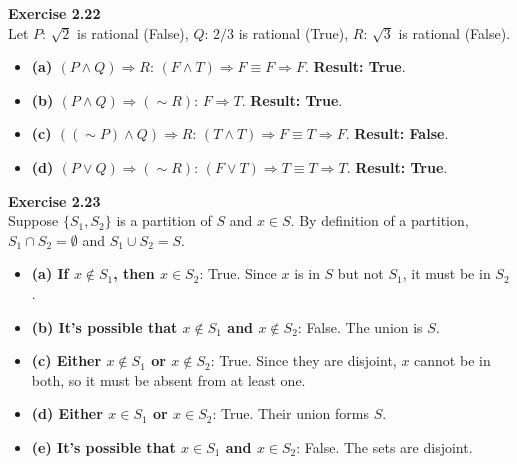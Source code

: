 \documentclass[11pt]{article}
\begin{document}
\vspace{10pt}
\textbf{Exercise 2.22} \\
Let $P$: $\sqrt{2}$ is rational (False), $Q$: $2/3$ is rational (True), $R$: $\sqrt{3}$ is rational (False).
\begin{itemize}
    \item \textbf{(a) $(P \wedge Q) \Rightarrow R$}: $(F \wedge T) \Rightarrow F \equiv F \Rightarrow F$. \textbf{Result: True}.
    \item \textbf{(b) $(P \wedge Q) \Rightarrow (\sim R)$}: $F \Rightarrow T$. \textbf{Result: True}.
    \item \textbf{(c) $((\sim P) \wedge Q) \Rightarrow R$}: $(T \wedge T) \Rightarrow F \equiv T \Rightarrow F$. \textbf{Result: False}.
    \item \textbf{(d) $(P \vee Q) \Rightarrow (\sim R)$}: $(F \vee T) \Rightarrow T \equiv T \Rightarrow T$. \textbf{Result: True}.
\end{itemize}

\vspace{10pt}
\textbf{Exercise 2.23} \\
Suppose $\{S_1, S_2\}$ is a partition of $S$ and $x \in S$. By definition of a partition, $S_1 \cap S_2 = \emptyset$ and $S_1 \cup S_2 = S$.
\begin{itemize}
    \item \textbf{(a) If $x \notin S_1$, then $x \in S_2$}: True. Since $x$ is in $S$ but not $S_1$, it must be in $S_2$.
    \item \textbf{(b) It's possible that $x \notin S_1$ and $x \notin S_2$}: False. The union is $S$.
    \item \textbf{(c) Either $x \notin S_1$ or $x \notin S_2$}: True. Since they are disjoint, $x$ cannot be in both, so it must be absent from at least one.
    \item \textbf{(d) Either $x \in S_1$ or $x \in S_2$}: True. Their union forms $S$.
    \item \textbf{(e) It's possible that $x \in S_1$ and $x \in S_2$}: False. The sets are disjoint.
\end{itemize}
\end{document}
